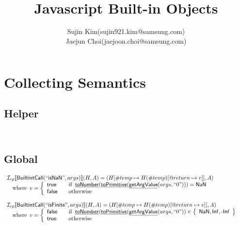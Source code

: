 \documentclass{article}
\title{Javascript Built-in Objects}
\author{Sujin Kim(sujin921.kim@samsung.com)	
\\Jaejun Choi(jaejoon.choi@samsung.com)}
\newcommand{\SF}[1]{\mbox{\textsf{#1}}}
\newcommand{\wherec}[1]{{\rm where}\begin{array}[t]{l}#1\end{array}}
\newcommand{\ifc}[1]{{\rm if}\begin{array}[t]{l}#1\end{array}}
\newcommand{\owc}{{\rm otherwise}}
\newcommand{\I}{\mathcal{I}}
\newcommand{\set}[1]{\left\{\begin{array}{l}#1\end{array}\right\}}
\newcommand{\lbr}{\llbracket}
\newcommand{\rbr}{\rrbracket}
\newcommand{\hf}[1]{\underline{\sf #1}}
\begin{document}
\maketitle
\section{Collecting Semantics}

\subsection{Helper}

\[
\begin{array}{ll}
\\\\
\end{array}
\]

\subsection{Global}

\[
\begin{array}{l}

\I _{cp}\lbr \SF{BuiltintCall}(``\SF{isNaN}",args)\rbr(H,A)
  = (H[\#temp \mapsto H(\#temp)[@return \mapsto v]], A)\\
 \quad\wherec{
  v =
  \left\{
    \begin{array}{l@{\quad\quad}l}
      \SF{true} & \ifc{\hf{toNumber}(\hf{toPrimitive}(\hf{getArgValue}(args, ``0")))=\SF{NaN}} \\
      \SF{false} & \owc \\
    \end{array}
  \right.}
\\\\

\I _{cp}\lbr \SF{BuiltintCall}(``\SF{isFinite}",args)\rbr(H,A)\hf{} 
 = (H[\#temp \mapsto H(\#temp)[@return \mapsto v]], A)\\
 \quad\wherec{
  v =
  \left\{
    \begin{array}{l@{\quad\quad}l}
      \SF{false} & \ifc{\hf{toNumber}(\hf{toPrimitive}(\hf{getArgValue}(args, ``0")) \in \set{\SF{NaN}, \SF{Inf}, \SF{-Inf}}}\\
      \SF{true} & \owc\\
    \end{array}
  \right.}
\\\\
\end{array}
\]
\end{document}
